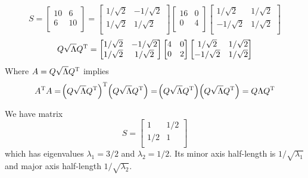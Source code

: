 \documentclass[a4paper]{article}
\begin{document}
\[
	S = 
	\begin{bmatrix}
		10 & 6 \\
		6 & 10 \\
	\end{bmatrix}
	=
	\begin{bmatrix}
		1/\sqrt{2} & -1/\sqrt{2} \\
		1/\sqrt{2} & 1/\sqrt{2} \\
	\end{bmatrix}
	\begin{bmatrix}
		16 & 0 \\
		0 & 4 \\
	\end{bmatrix}
	\begin{bmatrix}
		1/\sqrt{2} & 1/\sqrt{2} \\
		-1/\sqrt{2} & 1/\sqrt{2} \\
	\end{bmatrix}
\]
\[
	Q \sqrt{\Lambda}Q^{\textsc{T}} =
	\begin{bmatrix}
		1/\sqrt{2} & -1/\sqrt{2} \\
		1/\sqrt{2} & 1/\sqrt{2} \\
	\end{bmatrix}
	\begin{bmatrix}
		4 & 0 \\
		0 & 2 \\
	\end{bmatrix}
	\begin{bmatrix}
		1/\sqrt{2} & 1/\sqrt{2} \\
		-1/\sqrt{2} & 1/\sqrt{2} \\
	\end{bmatrix}
\]
Where \(A = Q \sqrt{\Lambda}Q^{\textsc{T}}\) implies
\[
	A^{\textsc{T}}A = \!\left( Q \sqrt{\Lambda}Q^{\textsc{T}} \right)^{\textsc{T}} \!\left( Q \sqrt{\Lambda}Q^{\textsc{T}} \right) = \!\left( Q \sqrt{\Lambda}Q^{\textsc{T}} \right) \!\left( Q \sqrt{\Lambda}Q^{\textsc{T}} \right) = Q \Lambda Q^{\textsc{T}}
\]


We have matrix
\[
	S = 
	\begin{bmatrix}
		1 & 1/2 \\
		1/2 & 1 \\
	\end{bmatrix}
\]
which has eigenvalues \(\lambda_{1} = 3/2\) and \(\lambda_{2} = 1/2\). Its minor axis half-length is \(1/\sqrt{\lambda_{1}}\) and major axis half-length \(1/\sqrt{\lambda_{2}}\).
\end{document}
